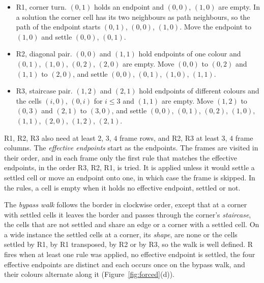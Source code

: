 \documentclass[11pt]{article}
\newcommand{\ent}[1]{\textsf{#1}}
\begin{document}
\begin{itemize}
\item \ent{R1}, corner turn. $(0,1)$ holds an endpoint and $(0,0)$, $(1,0)$ are empty. In a
  solution the corner cell has its two neighbours as path neighbours, so the path of the endpoint
  starts $(0,1)$, $(0,0)$, $(1,0)$. Move the endpoint to $(1,0)$ and settle $(0,0)$, $(0,1)$.
\item \ent{R2}, diagonal pair. $(0,0)$ and $(1,1)$ hold endpoints of one colour and $(0,1)$,
  $(1,0)$, $(0,2)$, $(2,0)$ are empty. Move $(0,0)$ to $(0,2)$ and $(1,1)$ to $(2,0)$, and settle
  $(0,0)$, $(0,1)$, $(1,0)$, $(1,1)$.
\item \ent{R3}, staircase pair. $(1,2)$ and $(2,1)$ hold endpoints of different colours and the
  cells $(i,0)$, $(0,i)$ for $i\le 3$ and $(1,1)$ are empty. Move $(1,2)$ to $(0,3)$ and $(2,1)$
  to $(3,0)$, and settle $(0,0)$, $(0,1)$, $(0,2)$, $(1,0)$, $(1,1)$, $(2,0)$, $(1,2)$, $(2,1)$.
\end{itemize}
\ent{R1}, \ent{R2}, \ent{R3} also need at least $2$, $3$, $4$ frame rows, and \ent{R2}, \ent{R3} at least $3$,
$4$ frame columns.
The \emph{effective endpoints} start as the endpoints. The frames are visited in their order, and
in each frame only the first rule that matches the effective endpoints, in the order \ent{R3},
\ent{R2}, \ent{R1}, is tried. It is applied unless it would settle a settled cell or move an
endpoint onto one, in which case the frame is skipped. In the rules, a cell is empty when it holds no
effective endpoint, settled or not.

The \emph{bypass walk} follows the border in clockwise order, except that at a corner with
settled cells it leaves the border and passes through the corner's \emph{staircase}, the cells
that are not settled and share an edge or a corner with a settled cell. On a wide instance
the settled cells at a corner, its \emph{shape}, are none or the cells settled by \ent{R1}, by
\ent{R1} transposed, by \ent{R2} or by \ent{R3}, so the walk is well defined. \ent{R} fires when at least one rule was
applied, no effective endpoint is settled, the four effective endpoints are distinct and each
occurs once on the bypass walk, and their colours alternate along it
(Figure~\ref{fig:forced}(d)).
\end{document}
